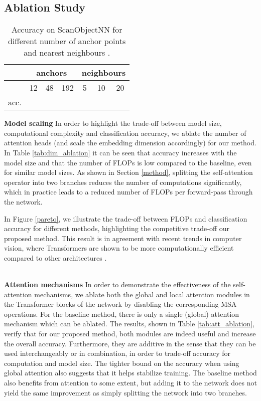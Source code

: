 \documentclass[a4paper,conference]{IEEEtran}
\begin{document}
\subsection{Ablation Study}


\begin{table*}[t]
	\caption{Accuracy on ScanObjectNN for different number of anchor points  and nearest neighbours .}
	\centering
	\begin{tabular}{lccc|ccc}
	& \multicolumn{3}{|c|}{anchors} & \multicolumn{3}{c}{neighbours} \\
	\midrule
	\multicolumn{1}{c|}{} & 12 & 48 & 192 & 5 & 10 & 20 \\
	\multicolumn{1}{c|}{acc.} &  &  &  &  &  &  \\
	\bottomrule
	\end{tabular}
	\label{tab:anchor_ablation}
\end{table*}

\noindent \textbf{Model scaling} In order to highlight the trade-off between model size, computational complexity and classification accuracy, we ablate the number of attention heads (and scale the embedding dimension  accordingly) for our method. In Table \ref{tab:dim_ablation} it can be seen that accuracy increases with the model size and that the number of FLOPs is low compared to the baseline, even for similar model sizes. As shown in Section \ref{method}, splitting the self-attention operator into two branches reduces the number of computations significantly, which in practice leads to a reduced number of FLOPs per forward-pass through the network. 

In Figure \ref{pareto}, we illustrate the trade-off between FLOPs and classification accuracy for different methods, highlighting the competitive trade-off our proposed method. This result is in agreement with recent trends in computer vision, where Transformers are shown to be more computationally efficient compared to other architectures \cite{han2021transformer}. \\~\

\noindent \textbf{Attention mechanisms} In order to demonstrate the effectiveness of the self-attention mechanisms, we ablate both the global and local attention modules in the Transformer blocks of the network by disabling the corresponding MSA operations. For the baseline method, there is only a single (global) attention mechanism which can be ablated. The results, shown in Table \ref{tab:att_ablation}, verify that for our proposed method, both modules are indeed useful and increase the overall accuracy. Furthermore, they are additive in the sense that they can be used interchangeably or in combination, in order to trade-off accuracy for computation and model size. The tighter bound on the accuracy when using global attention also suggests that it helps stabilize training. The baseline method also benefits from attention to some extent, but adding it to the network does not yield the same improvement as simply splitting the network into two branches. \\~\
\end{document}
